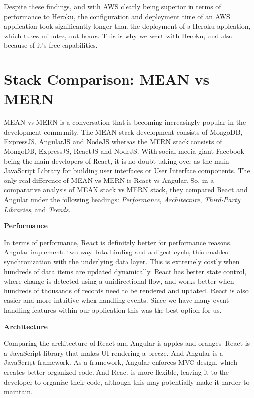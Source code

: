 Despite these findings, and with AWS clearly being superior in terms of performance to Heroku, the configuration and deployment time of an AWS application took significantly longer than the deployment of a Heroku applcation, which takes minutes, not hours. This is why we went with Heroku, and also because of it's free capabilities.

\section{Stack Comparison: MEAN vs MERN}
\label{Section:Stack Comparison: MEAN vs MERN}
MEAN vs MERN is a conversation that is becoming increasingly popular in the development community. The MEAN stack development consists of MongoDB, ExpressJS, AngularJS and NodeJS whereas the MERN stack consists of MongoDB, ExpressJS, ReactJS and NodeJS. With social media giant Facebook being the main developers of React, it is no doubt taking over as the main JavaScript Library for building user interfaces or User Interface components. The only real difference of MEAN vs MERN is React vs Angular. So, in a comparative analysis \cite{aggarwal2018comparative} of MEAN stack vs MERN stack, they compared React and Angular under the following headings: \textit{Performance}, \textit{Architecture}, \textit{Third-Party Libraries}, and \textit{Trends}. 

\textbf{Performance}

In terms of performance, React is definitely better for performance reasons. Angular implements two way data binding and a digest cycle, this enables synchronization with the underlying data layer. This is extremely costly when hundreds of data items are updated dynamically. React has better state control, where change is detected using a unidirectional flow, and works better when hundreds of thousands of records need to be rendered and updated. React is also easier and more intuitive when handling events. Since we have many event handling features within our application this was the best option for us.

\textbf{Architecture}

Comparing the architecture of React and Angular is apples and oranges. React is a JavaScript library that makes UI rendering a breeze. And Angular is a JavaScript framework. As a framework, Angular enforces MVC design, which creates better organized code. And React is more flexible, leaving it to the developer to organize their code, although this may potentially make it harder to maintain.

